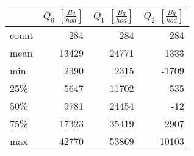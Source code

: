 \begin{tabular}{lrrr}
\toprule
{} &  $Q_0$ $\left[\si{\frac{Bq}{hod}}\right]$ &  $Q_1$ $\left[\si{\frac{Bq}{hod}}\right]$ &  $Q_2$ $\left[\si{\frac{Bq}{hod}}\right]$ \\
\midrule
count &                                       284 &                                       284 &                                       284 \\
mean  &                                     13429 &                                     24771 &                                      1333 \\
min   &                                      2390 &                                      2315 &                                     -1709 \\
25\%   &                                      5647 &                                     11702 &                                      -535 \\
50\%   &                                      9781 &                                     24454 &                                       -12 \\
75\%   &                                     17323 &                                     35419 &                                      2907 \\
max   &                                     42770 &                                     53869 &                                     10103 \\
\bottomrule
\end{tabular}
